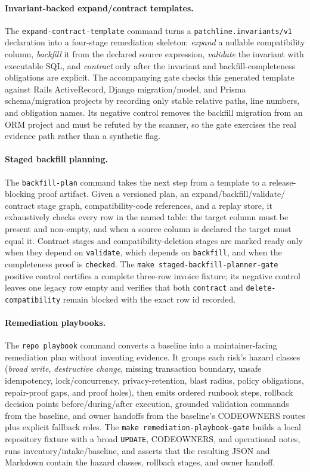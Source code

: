 \documentclass[11pt]{article}
\newcommand{\code}[1]{\texttt{#1}}
\newcommand{\gate}[1]{\texttt{make #1}}
\begin{document}
\paragraph{Invariant-backed expand/contract templates.} The \code{expand-contract-template} command
turns a \code{patchline.invariants/v1} declaration into a four-stage remediation skeleton:
\emph{expand} a nullable compatibility column, \emph{backfill} it from the declared source expression,
\emph{validate} the invariant with executable SQL, and \emph{contract} only after the invariant and
backfill-completeness obligations are explicit. The accompanying gate checks this generated template
against Rails ActiveRecord, Django migration/model, and Prisma schema/migration projects by recording
only stable relative paths, line numbers, and obligation names. Its negative control removes the
backfill migration from an ORM project and must be refuted by the scanner, so the gate exercises the
real evidence path rather than a synthetic flag.

\paragraph{Staged backfill planning.} The \code{backfill-plan} command takes the next step from a
template to a release-blocking proof artifact. Given a versioned plan, an expand/backfill/validate/
contract stage graph, compatibility-code references, and a replay store, it exhaustively checks every
row in the named table: the target column must be present and non-empty, and when a source column is
declared the target must equal it. Contract stages and compatibility-deletion stages are marked ready
only when they depend on \code{validate}, which depends on \code{backfill}, and when the completeness
proof is \code{checked}. The \gate{staged-backfill-planner-gate} positive control certifies a complete
three-row invoice fixture; its negative control leaves one legacy row empty and verifies that both
\code{contract} and \code{delete-compatibility} remain blocked with the exact row id recorded.

\paragraph{Remediation playbooks.} The \code{repo playbook} command converts a baseline into a
maintainer-facing remediation plan without inventing evidence. It groups each risk's hazard classes
(\emph{broad write}, \emph{destructive change}, missing transaction boundary, unsafe idempotency,
lock/concurrency, privacy-retention, blast radius, policy obligations, repair-proof gaps, and proof
holes), then emits ordered runbook steps, rollback decision points before/during/after execution,
grounded validation commands from the baseline, and owner handoffs from the baseline's CODEOWNERS
routes plus explicit fallback roles. The \gate{remediation-playbook-gate} builds a local repository
fixture with a broad \code{UPDATE}, CODEOWNERS, and operational notes, runs inventory/intake/baseline,
and asserts that the resulting JSON and Markdown contain the hazard classes, rollback stages, and
owner handoff.
\end{document}
